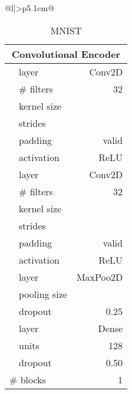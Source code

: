 \documentclass[twoside,11pt]{article}
\begin{document}
\begin{table}[t!]
\begin{tabular}[t]{@{}l|>{\raggedleft\arraybackslash}p{5.1cm}@{}}
\begin{table}[t!]
\caption{\small Top-performing architectures used in our experiments on MNIST and IMDB datasets.}
\label{tab:architectures-mnist-imdb}
\smallskip
\centering
\begin{subtable}[t]{.52\textwidth}
\caption{\small MNIST}
\scriptsize
\def\arraystretch{1.2}
\setlength\tabcolsep{2pt}
\begin{tabular}[t]{@{}c|l|r@{}}
    \toprule
    \multicolumn{3}{c}{\textbf{Convolutional Encoder}}          \\
    \midrule
    \multirow{15}{*}{\rotatebox{90}{Convolutional Block}}
    &   layer                           & Conv2D                \\
    &   \# filters                      & 32                    \\
    &   kernel size                     &           \\
    &   strides                         &           \\
    &   padding                         & valid                 \\
    &   activation                      & ReLU                  \\
    \cmidrule{2-3}
    &   layer                           & Conv2D                \\
    &   \# filters                      & 32                    \\
    &   kernel size                     &           \\
    &   strides                         &           \\
    &   padding                         & valid                 \\
    &   activation                      & ReLU                  \\
    \cmidrule{2-3}
    &   layer                           & MaxPoo2D              \\
    &   pooling size                    &           \\
    &   dropout                         & 0.25                  \\
    \midrule
    &   layer                           & Dense                 \\
    &   units                           & 128                   \\
    &   dropout                         & 0.50                  \\
    \midrule
    \multicolumn{2}{l}{\# blocks}       & 1                     \\

\end{tabular}
\end{subtable}
\end{table}
\end{tabular}
\end{table}
\end{document}

